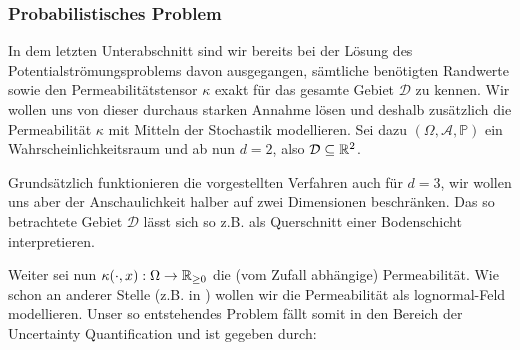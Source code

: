 \subsubsection{Probabilistisches Problem}
\label{Probabilistisches Problem}
In dem letzten Unterabschnitt sind wir bereits bei der Lösung des Potentialströmungsproblems davon ausgegangen, sämtliche benötigten Randwerte sowie den Permeabilitätstensor $\kappa$ exakt für das gesamte Gebiet $\mathcal{D}$ zu kennen.
Wir wollen uns von dieser durchaus starken Annahme lösen und deshalb zusätzlich die Permeabilität $\kappa$ mit Mitteln der Stochastik modellieren.
Sei dazu $(\Omega, \mathcal{A},\mathbb{P})$ ein Wahrscheinlichkeitsraum und ab nun $d=2$, also $\mathcal{D} \subseteq \mathbb{R}^2$.
\begin{Bemerkung}
	Grundsätzlich funktionieren die vorgestellten Verfahren auch für $d=3$, wir wollen uns aber der Anschaulichkeit halber auf zwei Dimensionen beschränken. Das so betrachtete Gebiet $\mathcal{D}$ lässt sich so z.B. als Querschnitt einer Bodenschicht interpretieren.
\end{Bemerkung} 
Weiter sei nun $\kappa (\cdot,x): \Omega \rightarrow \mathbb{R}_{\geq0}$ die (vom Zufall abhängige) Permeabilität.
Wie schon an anderer Stelle (z.B. in \cite{kumar2018multigrid}) wollen wir die Permeabilität als lognormal-Feld modellieren.
Unser so entstehendes Problem fällt somit in den Bereich der Uncertainty Quantification und ist gegeben durch: 


